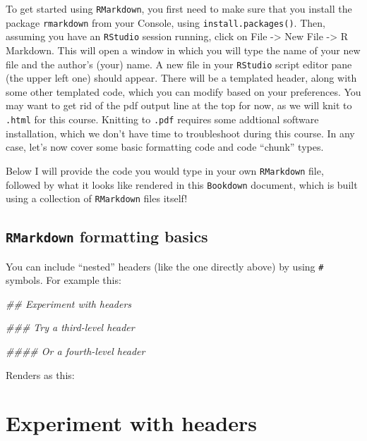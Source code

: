 \documentclass[
]{book}
\newenvironment{Shaded}{\begin{snugshade}}{\end{snugshade}}
\newcommand{\CommentTok}[1]{\textcolor[rgb]{0.56,0.35,0.01}{\textit{#1}}}
\begin{document}
To get started using \texttt{RMarkdown}, you first need to make sure that you install the package \texttt{rmarkdown} from your Console, using \texttt{install.packages()}. Then, assuming you have an \texttt{RStudio} session running, click on File -\textgreater{} New File -\textgreater{} R Markdown. This will open a window in which you will type the name of your new file and the author's (your) name. A new file in your \texttt{RStudio} script editor pane (the upper left one) should appear. There will be a templated header, along with some other templated code, which you can modify based on your preferences. You may want to get rid of the pdf output line at the top for now, as we will knit to \texttt{.html} for this course. Knitting to \texttt{.pdf} requires some addtional software installation, which we don't have time to troubleshoot during this course. In any case, let's now cover some basic formatting code and code ``chunk'' types.

Below I will provide the code you would type in your own \texttt{RMarkdown} file, followed by what it looks like rendered in this \texttt{Bookdown} document, which is built using a collection of \texttt{RMarkdown} files itself!

\hypertarget{rmarkdown-formatting-basics}{%
\subsection{\texorpdfstring{\texttt{RMarkdown} formatting basics}{RMarkdown formatting basics}}\label{rmarkdown-formatting-basics}}

You can include ``nested'' headers (like the one directly above) by using \texttt{\#} symbols. For example this:

\begin{Shaded}
\begin{Highlighting}[]
\CommentTok{\#\# Experiment with headers}

\CommentTok{\#\#\# Try a third{-}level header}

\CommentTok{\#\#\#\# Or a fourth{-}level header}
\end{Highlighting}
\end{Shaded}

Renders as this:

\hypertarget{experiment-with-headers}{%
\section{Experiment with headers}\label{experiment-with-headers}}
\end{document}
